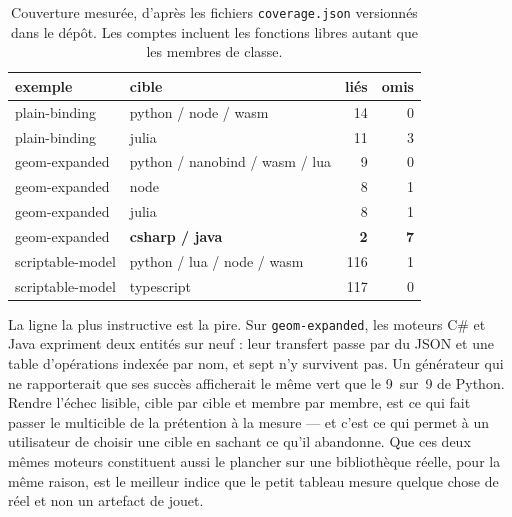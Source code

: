\documentclass[11pt,a4paper]{article}
\newcommand{\code}[1]{\texttt{\small #1}}
\begin{document}
\begin{table}[h]
\centering\small
\begin{tabular}{llrr}
\toprule
exemple & cible & liés & omis \\
\midrule
plain-binding  & python / node / wasm & 14 & 0 \\
plain-binding  & julia                & 11 & 3 \\
geom-expanded  & python / nanobind / wasm / lua & 9 & 0 \\
geom-expanded  & node                 & 8 & 1 \\
geom-expanded  & julia                & 8 & 1 \\
geom-expanded  & \textbf{csharp / java} & \textbf{2} & \textbf{7} \\
scriptable-model & python / lua / node / wasm & 116 & 1 \\
scriptable-model & typescript          & 117 & 0 \\
\bottomrule
\end{tabular}
\caption{Couverture mesurée, d'après les fichiers \code{coverage.json} versionnés
dans le dépôt. Les comptes incluent les fonctions libres autant que les membres
de classe.}
\label{tab:coverage}
\end{table}

La ligne la plus instructive est la pire. Sur \code{geom-expanded}, les moteurs
C\# et Java expriment deux entités sur neuf : leur transfert passe par du JSON et
une table d'opérations indexée par nom, et sept n'y survivent pas. Un générateur
qui ne rapporterait que ses succès afficherait le même vert que le 9~sur~9 de
Python. Rendre l'échec lisible, cible par cible et membre par membre, est ce qui
fait passer le \og multicible \fg{} de la prétention à la mesure --- et c'est ce
qui permet à un utilisateur de choisir une cible en sachant ce qu'il abandonne.
Que ces deux mêmes moteurs constituent aussi le plancher sur une bibliothèque
réelle, pour la même raison, est le meilleur indice que le petit tableau mesure
quelque chose de réel et non un artefact de jouet.
\end{document}
